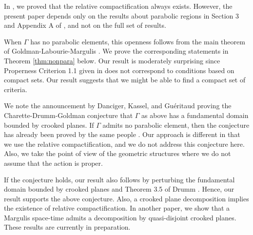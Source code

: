 \documentclass{amsart}
\numberwithin{equation}{section}
\newcommand\bR{{\mathbb{R}}}
\newcommand\Lspace{\mathsf E}
\theoremstyle{definition}
\theoremstyle{remark}
\newcommand{\rome}{\mathrm e}
\begin{document}
In \cite{CDG22}, we proved that the relative compactification always exists. 
However, the present paper depends only on the results about parabolic regions in Section 3 and Appendix A of \cite{CDG22}, and not on the full set of results. 


When $\Gamma$ has no parabolic elements, this openness follows from 
the main theorem of Goldman-Labourie-Margulis \cite{GLM09}.
We prove the corresponding statements 
in Theorem \ref{thm:nonpara} below. 
Our result is moderately surprising since Properness 
Criterion 1.1 given in \cite{CDG22} does not
correspond to conditions based on compact sets. 
Our result suggests that 
we might be able to find a compact set of criteria. 



We note the announcement by Danciger, Kassel, and Gu\'eritaud \cite{DGKp} 
proving the Charette-Drumm-Goldman conjecture that 
$\Gamma$ as above has a fundamental domain bounded by crooked planes.
If $\Gamma$ admits no parabolic element, then the conjecture 
has already been proved by the same people \cite{DGK16}. 
Our approach is different in that we use the relative compactification, 
and we do not address this conjecture here. Also, we 
take the point of view of 
the geometric structures where we do not assume that the action is proper.  

If the conjecture holds, our result also follows by perturbing the fundamental
domain bounded by crooked planes and Theorem 3.5 of Drumm \cite{Drumm92}.
Hence, our result supports the above conjecture.
Also, a crooked plane decomposition implies the existence of relative compactification. 
In another paper, we show that a Margulis space-time admits a decomposition by 
quasi-disjoint crooked planes.  These results are currently 
in preparation. 



\end{document}
